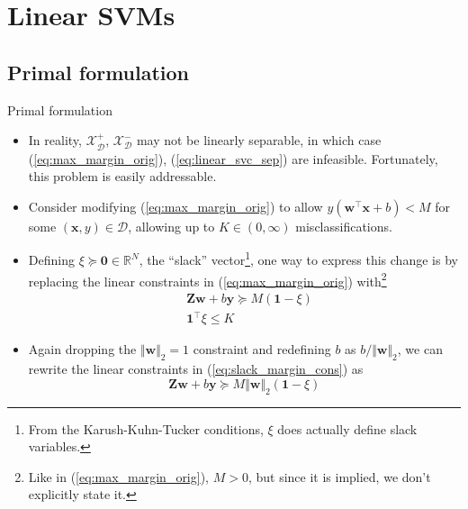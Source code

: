 \documentclass{beamer}
\numberwithin{equation}{section}
\newcommand{\aref}[1]{\alert{\ref{#1}}}
\begin{document}
\section{Linear SVMs}

\subsection{Primal formulation}

\begin{frame}{Primal formulation}
    \begin{itemize}
        \item
        In reality, $ \mathcal{X}_\mathcal{D}^+ $,
        $ \mathcal{X}_\mathcal{D}^- $ may not be linearly separable, in which
        case (\aref{eq:max_margin_orig}), (\aref{eq:linear_svc_sep}) are
        infeasible. Fortunately, this problem is easily addressable.

        \item
        Consider modifying (\aref{eq:max_margin_orig}) to allow
        $ y(\mathbf{w}^\top\mathbf{x} + b) < M $ for some $ (\mathbf{x}, y)
        \in \mathcal{D} $, allowing up to $ K \in (0, \infty) $
        misclassifications.

        \item
        Defining $ \xi \succeq \mathbf{0} \in \mathbb{R}^N $, the ``slack''
        vector\footnote{
            From the Karush-Kuhn-Tucker conditions, $ \xi $ does actually
            define slack variables.
        }, one way to express this change is by replacing the linear
        constraints in (\aref{eq:max_margin_orig}) with\footnote{
            Like in (\aref{eq:max_margin_orig}), $ M > 0 $, but since it is
            implied, we don't explicitly state it.
        }
        \begin{equation} \label{eq:slack_margin_cons}
            \begin{split}
                & \mathbf{Zw} + b\mathbf{y} \succeq M(\mathbf{1} - \xi) \\
                & \mathbf{1}^\top\xi \le K
            \end{split}
        \end{equation}

        \item
        Again dropping the $ \Vert\mathbf{w}\Vert_2 = 1 $ constraint and
        redefining $ b $ as $ b / \Vert\mathbf{w}\Vert_2 $, we can rewrite
        the linear constraints in (\aref{eq:slack_margin_cons}) as
        \begin{equation*}
            \mathbf{Zw} + b\mathbf{y} \succeq
            M\Vert\mathbf{w}\Vert_2(\mathbf{1} - \xi)
        \end{equation*}
    \end{itemize}
\end{frame}
\end{document}
